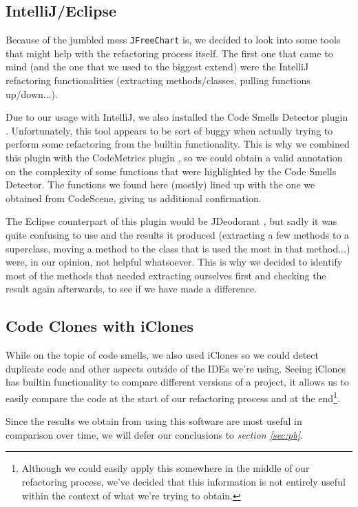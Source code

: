 \documentclass[11pt]{article}
\begin{document}
	\subsection{IntelliJ/Eclipse}
	Because of the jumbled mess \texttt{JFreeChart} is, we decided to look into some tools that might help with the refactoring process itself. The first one that came to mind (and the one that we used to the biggest extend) were the \textsf{IntelliJ} refactoring functionalities (extracting methods/classes, pulling functions up/down...).
	
	Due to our usage with \textsf{IntelliJ}, we also installed the \textsf{Code Smells Detector} plugin \cite{jetbrains-csd}. Unfortunately, this tool appears to be sort of buggy when actually trying to perform some refactoring from the builtin functionality. This is why we combined this plugin with the \textsf{CodeMetrics} plugin \cite{jetbrains-cm}, so we could obtain a valid annotation on the complexity of some functions that were highlighted by the \textsf{Code Smells Detector}. The functions we found here (mostly) lined up with the one we obtained from \textsf{CodeScene}, giving us additional confirmation.
	
	The \textsf{Eclipse} counterpart of this plugin would be \textsf{JDeodorant} \cite{jdeodorant}, but sadly it was quite confusing to use and the results it produced (extracting a few methods to a superclass, moving a method to the class that is used the most in that method...) were, in our opinion, not helpful whatsoever. This is why we decided to identify most of the methods that needed extracting ourselves first and checking the result again afterwards, to see if we have made a difference.
	
	\subsection{Code Clones with iClones}
	While on the topic of code smells, we also used \textsf{iClones} so we could detect duplicate code and other aspects outside of the IDEs we're using. Seeing \textsf{iClones} has builtin functionality to compare different versions of a project, it allows us to easily compare the code at the start of our refactoring process and at the end\footnote{Although we could easily apply this somewhere in the middle of our refactoring process, we've decided that this information is not entirely useful within the context of what we're trying to obtain.}.
	
	Since the results we obtain from using this software are most useful in comparison over time, we will defer our conclusions to \textsl{section \ref{sec:pb}}.
	
\end{document}

